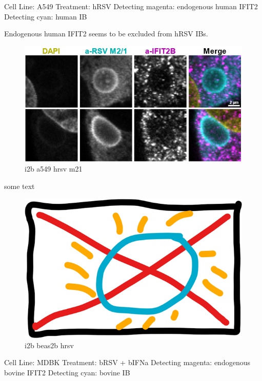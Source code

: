 Cell Line: A549 \newline
Treatment: hRSV \newline
Detecting magenta: endogenous human IFIT2  \newline
Detecting cyan: human IB \newline

Endogenous human IFIT2 seems to be excluded from hRSV IBs.

\begin{figure}
    \centering
    \includegraphics[width=1\linewidth]{09. Chapter 4//Figs//02. I2B/05. i2b a549 hrsv m21.png}
    \caption[i2b a549 hrsv m21]{i2b a549 hrsv m21}
    \label{i2b a549 hrsv m21}
\end{figure}

some text

\begin{figure}
    \centering
    \includegraphics[width=0.5\linewidth]{09. Chapter 4//Figs//02. I2B/00. placeholder.png}
    \caption[i2b beas2b hrsv]{i2b beas2b hrsv}
    \label{i2b beas2b hrsv}
\end{figure}

Cell Line: MDBK \newline
Treatment: bRSV + bIFNa \newline
Detecting magenta: endogenous bovine IFIT2  \newline
Detecting cyan: bovine IB \newline

